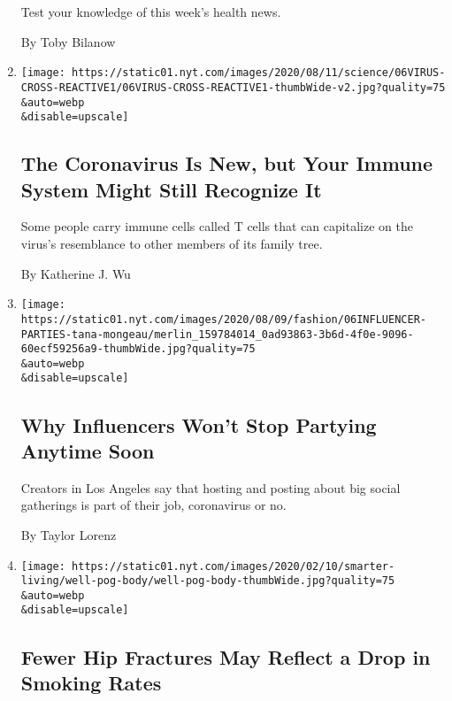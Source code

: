 \begin{enumerate}
  Test your knowledge of this week's health news.

  By Toby Bilanow
\item
  \href{/2020/08/06/health/coronavirus-immune-cells.html}{}

  \texttt{[image: https://static01.nyt.com/images/2020/08/11/science/06VIRUS-CROSS-REACTIVE1/06VIRUS-CROSS-REACTIVE1-thumbWide-v2.jpg?quality=75\\\&auto=webp\\\&disable=upscale]}

  \hypertarget{the-coronavirus-is-new-but-your-immune-system-might-still-recognize-it}{%
  \subsection{The Coronavirus Is New, but Your Immune System Might Still
  Recognize
  It}\label{the-coronavirus-is-new-but-your-immune-system-might-still-recognize-it}}

  Some people carry immune cells called T cells that can capitalize on
  the virus's resemblance to other members of its family tree.

  By Katherine J. Wu
\item
  \href{/2020/08/06/style/influencer-parties-jake-paul-tana-mongeau-thomas-petrou-hype-house.html}{}

  \texttt{[image: https://static01.nyt.com/images/2020/08/09/fashion/06INFLUENCER-PARTIES-tana-mongeau/merlin\_159784014\_0ad93863-3b6d-4f0e-9096-60ecf59256a9-thumbWide.jpg?quality=75\\\&auto=webp\\\&disable=upscale]}

  \hypertarget{why-influencers-wont-stop-partying-anytime-soon}{%
  \subsection{Why Influencers Won't Stop Partying Anytime
  Soon}\label{why-influencers-wont-stop-partying-anytime-soon}}

  Creators in Los Angeles say that hosting and posting about big social
  gatherings is part of their job, coronavirus or no.

  By Taylor Lorenz
\item
  \href{/2020/08/06/well/live/fewer-hip-fractures-may-reflect-a-drop-in-smoking-rates.html}{}

  \texttt{[image: https://static01.nyt.com/images/2020/02/10/smarter-living/well-pog-body/well-pog-body-thumbWide.jpg?quality=75\\\&auto=webp\\\&disable=upscale]}

  \hypertarget{fewer-hip-fractures-may-reflect-a-drop-in-smoking-rates}{%
  \subsection{Fewer Hip Fractures May Reflect a Drop in Smoking
  Rates}\label{fewer-hip-fractures-may-reflect-a-drop-in-smoking-rates}}


\end{enumerate}
